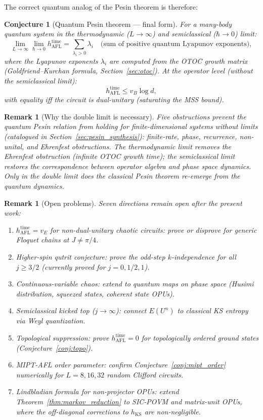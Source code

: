 \documentclass[12pt,a4paper]{article}
\newtheorem{remark}[theorem]{Remark}
\newtheorem{conjecture}[theorem]{Conjecture}
\begin{document}
The correct quantum analog of the Pesin theorem is therefore:
\begin{conjecture}[Quantum Pesin theorem — final form]
\label{conj:quantum_pesin_final}
For a many-body quantum system in the thermodynamic ($L\to\infty$) and
semiclassical ($\hbar\to 0$) limit:
\[
  \lim_{L\to\infty}\lim_{\hbar\to 0}
  h_{\mathrm{AFL}}^{\mathrm{time}}
  = \sum_{\lambda_i > 0} \lambda_i
  \quad\text{(sum of positive quantum Lyapunov exponents)},
\]
where the Lyapunov exponents $\lambda_i$ are computed from the
OTOC growth matrix (Goldfriend--Kurchan formula,
Section~\ref{sec:otoc}).  At the operator level (without the
semiclassical limit):
\[
  h_{\mathrm{AFL}}^{\mathrm{time}} \leq v_B\log d,
\]
with equality iff the circuit is dual-unitary (saturating the MSS bound).
\end{conjecture}

\begin{remark}[Why the double limit is necessary]
Five obstructions prevent the quantum Pesin relation from holding for
finite-dimensional systems without limits (catalogued in
Section~\ref{sec:pesin_synthesis}): finite-rate, phase, recurrence, non-unital,
and Ehrenfest obstructions.  The thermodynamic limit removes the Ehrenfest
obstruction (infinite OTOC growth time); the semiclassical limit restores
the correspondence between operator algebra and phase space dynamics.
Only in the double limit does the classical Pesin theorem re-emerge from
the quantum dynamics.
\end{remark}

\begin{remark}[Open problems]
Seven directions remain open after the present work:
\begin{enumerate}
\item \emph{$h_{\mathrm{AFL}}^{\mathrm{time}} = v_E$ for non-dual-unitary chaotic circuits}:
  prove or disprove for generic Floquet chains at $J \ne \pi/4$.
\item \emph{Higher-spin qutrit conjecture}: prove the odd-step $k$-independence
  for all $j \geq 3/2$ (currently proved for $j=0,1/2,1$).
\item \emph{Continuous-variable chaos}: extend to quantum maps on phase space
  (Husimi distribution, squeezed states, coherent state OPUs).
\item \emph{Semiclassical kicked top} ($j\to\infty$): connect $E(U^n)$ to
  classical KS entropy via Weyl quantization.
\item \emph{Topological suppression}: prove $h_{\mathrm{AFL}}^{\mathrm{time}} = 0$
  for topologically ordered ground states (Conjecture~\ref{conj:topo}).
\item \emph{MIPT-AFL order parameter}: confirm Conjecture~\ref{conj:mipt_order}
  numerically for $L = 8,16,32$ random Clifford circuits.
\item \emph{Lindbladian formula for non-projector OPUs}: extend
  Theorem~\ref{thm:markov_reduction} to SIC-POVM and matrix-unit OPUs,
  where the off-diagonal corrections to $h_{\mathrm{KS}}$ are non-negligible.
\end{enumerate}
\end{remark}
\end{document}
